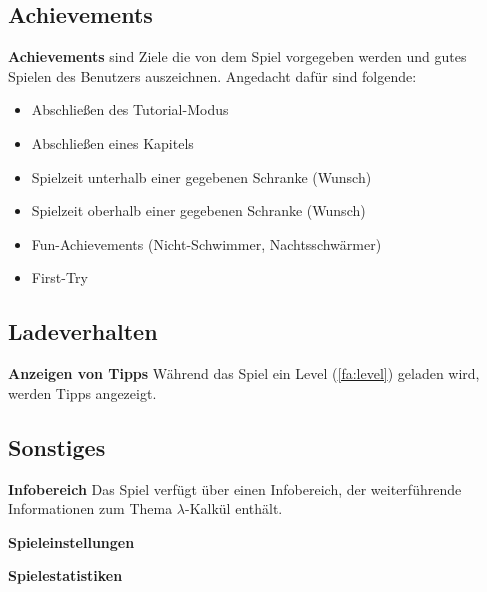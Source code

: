 \documentclass{scrartcl}
\begin{document}
\subsection{Achievements}

\begin{falist}[resume]
    \item \label{fa:achievements} \textbf{Achievements} sind Ziele die von dem Spiel vorgegeben werden und gutes Spielen des Benutzers auszeichnen. Angedacht dafür sind folgende:
    \begin{itemize}
    	\item Abschließen des Tutorial-Modus
    	\item Abschließen eines Kapitels
    	\item Spielzeit unterhalb einer gegebenen Schranke (Wunsch)
    	\item Spielzeit oberhalb einer gegebenen Schranke (Wunsch)
    	\item Fun-Achievements (Nicht-Schwimmer, Nachtsschwärmer)
    	\item First-Try
    \end{itemize}
\end{falist}

\subsection{Ladeverhalten}

\begin{falist}[resume]
	\item \label{fa:tipps} \textbf{Anzeigen von Tipps} Während das Spiel ein Level (\ref{fa:level}) geladen wird, werden Tipps angezeigt.
\end{falist}

\subsection{Sonstiges}

\begin{falist}[resume]
	\item \label{fa:infobereich} \textbf{Infobereich} Das Spiel verfügt über einen Infobereich, der weiterführende Informationen zum Thema $\lambda$-Kalkül enthält.
	\item \label{fa:spieleinstellungen} \textbf{Spieleinstellungen}
	\item \label{fa:spielestatistiken} \textbf{Spielestatistiken}
	
\end{falist}
\end{document}

